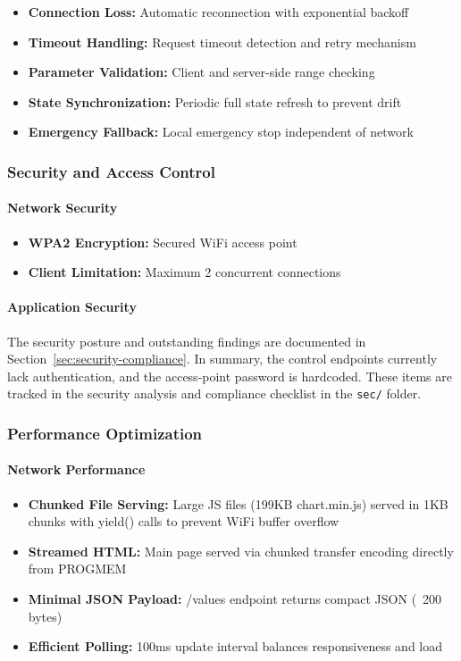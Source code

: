 \begin{itemize}
    \item \textbf{Connection Loss:} Automatic reconnection with exponential backoff
    \item \textbf{Timeout Handling:} Request timeout detection and retry mechanism
    \item \textbf{Parameter Validation:} Client and server-side range checking
    \item \textbf{State Synchronization:} Periodic full state refresh to prevent drift
    \item \textbf{Emergency Fallback:} Local emergency stop independent of network
\end{itemize}

\subsubsection{Security and Access Control}

\paragraph{Network Security}
\begin{itemize}
    \item \textbf{WPA2 Encryption:} Secured WiFi access point
    \item \textbf{Client Limitation:} Maximum 2 concurrent connections
\end{itemize}

\paragraph{Application Security}
The security posture and outstanding findings are documented in Section~\ref{sec:security-compliance}. In summary, the control endpoints currently lack authentication, and the access-point password is hardcoded. These items are tracked in the security analysis and compliance checklist in the \texttt{sec/} folder.

\subsubsection{Performance Optimization}

\paragraph{Network Performance}
\begin{itemize}
    \item \textbf{Chunked File Serving:} Large JS files (199KB chart.min.js) served in 1KB chunks with yield() calls to prevent WiFi buffer overflow
    \item \textbf{Streamed HTML:} Main page served via chunked transfer encoding directly from PROGMEM
    \item \textbf{Minimal JSON Payload:} /values endpoint returns compact JSON (~200 bytes)
    \item \textbf{Efficient Polling:} 100ms update interval balances responsiveness and load
\end{itemize}

